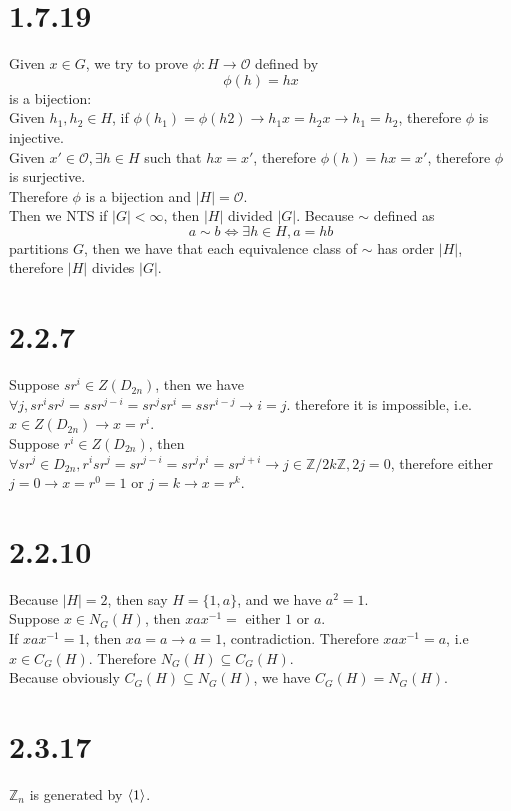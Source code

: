 \documentclass{article}
\begin{document}
\section{1.7.19}
Given $x \in G$, we try to prove $\phi: H \rightarrow \mathcal{O}$ defined by
\begin{equation*}
    \phi(h) = hx
\end{equation*}
is a bijection:\\
Given $h_1, h_2 \in H$, if $\phi(h_1) = \phi(h2) \rightarrow h_1x = h_2x \rightarrow h_1 = h_2$, therefore $\phi$ is injective.\\
Given $x' \in \mathcal{O}, \exists h \in H$ such that $hx = x'$, therefore $\phi(h) = hx = x'$, therefore $\phi$ is surjective.\\
Therefore $\phi$ is a bijection and $|H| = \mathcal{O}$.\\
Then we NTS if $|G| < \infty$, then $|H|$ divided $|G|$. Because $\sim$ defined as
\begin{equation*}
    a \sim b \iff \exists h \in H, a = hb 
\end{equation*}
partitions $G$, then we have that each equivalence class of $\sim$ has order $|H|$, therefore $|H|$ divides $|G|$.
\section{2.2.7}
Suppose $sr^i \in Z(D_{2n})$, then we have $\forall j, sr^isr^j = ssr^{j-i} = sr^jsr^i = ssr^{i-j} \rightarrow i = j$. therefore it is impossible, i.e. $x \in Z(D_{2n}) \rightarrow x = r^i$.\\
Suppose $r^i \in Z(D_{2n})$, then $\forall sr^j \in D_{2n}, r^isr^j = sr^{j-i} = sr^jr^i = sr^{j+i} \rightarrow j \in \mathbb{Z}/2k\mathbb{Z}, 2j = 0$, therefore either $j = 0 \rightarrow x = r^0 = 1$ or $j = k \rightarrow x = r^k$.
\section{2.2.10}
Because $|H| = 2$, then say $H = \{1, a\}$, and we have $a^2 = 1$.\\
Suppose $x \in N_G(H)$, then $xax^{-1} =$ either $1$ or $a$.\\
If $xax^{-1} = 1$, then $xa = a \rightarrow a = 1$, contradiction. Therefore $xax^{-1} = a$, i.e $x \in C_G(H)$. Therefore $N_G(H) \subseteq C_G(H)$.\\
Because obviously $C_G(H) \subseteq N_G(H)$, we have $C_G(H) = N_G(H)$.
\section{2.3.17}
$\mathbb{Z}_n$ is generated by $\braket{1}$.\\
\end{document}
